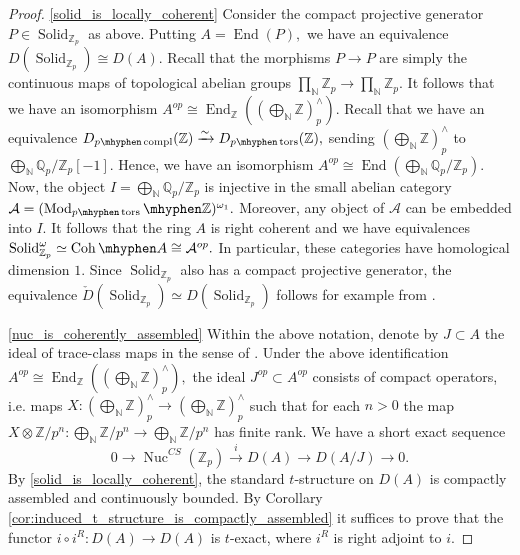 \documentclass[11pt,leqno]{amsart}
\numberwithin{equation}{section}
\def\N{\mathbb{N}}
\def\Z{\mathbb{Z}}
\def\Q{\mathbb{Q}}
\def\End{\operatorname{End}}
\newcommand{\hy}{\mhyphen}
\newcommand{\biggplus}[1][]{\mathop{\bigoplus}\limits_{#1}}
\newcommand{\prodd}[1][]{\mathop{\prod}\limits_{#1}}
\newcommand{\xto}{\xrightarrow}
\newcommand{\Nuc}{\operatorname{Nuc}}
\newcommand{\Solid}{\operatorname{Solid}}
\newcommand{\Coh}{\operatorname{Coh}}
\newcommand{\cA}{{\mathcal A}}
\newcommand{\tors}{\operatorname{tors}}
\newcommand{\compl}{\operatorname{compl}}
\newcommand{\Mod}{\operatorname{Mod}}
\begin{document}
\begin{proof}
\ref{solid_is_locally_coherent} Consider the compact projective generator $P\in\Solid_{\Z_p}$ as above. Putting $A=\End(P),$ we have an equivalence $D(\Solid_{\Z_p})\cong D(A).$ Recall that the morphisms $P\to P$ are simply the continuous maps of topological abelian groups $\prodd[\N]\Z_p\to \prodd[\N]\Z_p.$ It follows that we have an isomorphism $A^{op}\cong\End_{\Z}((\biggplus[\N]\Z)^{\wedge}_p).$ Recall that we have an equivalence $D_{p\hy\compl}(\Z)\xto{\sim}D_{p\hy\tors}(\Z),$ sending $(\biggplus[\N]\Z)^{\wedge}_p$ to $\biggplus[\N]\Q_p/\Z_p[-1].$ Hence, we have an isomorphism $A^{op}\cong \End(\biggplus[\N]\Q_p/\Z_p).$ Now, the object $I=\biggplus[\N]\Q_p/\Z_p$ is injective in the small abelian category $\cA=(\Mod_{p\hy\tors}\hy\Z)^{\omega_1}.$ Moreover, any object of $\cA$ can be embedded into $I.$ It follows that the ring $A$ is right coherent and we have equivalences $\Solid_{\Z_p}^{\omega}\simeq \Coh\hy A\cong \cA^{op}.$ In particular, these categories have homological dimension $1.$ Since $\Solid_{\Z_p}$ also has a compact projective generator, the equivalence $\check{D}(\Solid_{\Z_p})\simeq D(\Solid_{\Z_p})$ follows for example from \cite[Proposition C.5.8.12]{Lur18}.

\ref{nuc_is_coherently_assembled} Within the above notation, denote by $J\subset A$ the ideal of trace-class maps in the sense of \cite[Definition 13.11]{CS20}. Under the above identification $A^{op}\cong\End_{\Z}((\biggplus[\N]\Z)^{\wedge}_p),$ the ideal $J^{op}\subset A^{op}$ consists of compact operators, i.e. maps $X:(\biggplus[\N]\Z)^{\wedge}_p\to (\biggplus[\N]\Z)^{\wedge}_p$ such that for each $n>0$ the map $X\otimes\Z/p^n:\biggplus[\N]\Z/p^n\to \biggplus[\N]\Z/p^n$ has finite rank. We have a short exact sequence
\begin{equation*}
0\to \Nuc^{CS}(\Z_p)\xto{i} D(A)\to D(A/J)\to 0.
\end{equation*}
By \ref{solid_is_locally_coherent}, the standard $t$-structure on $D(A)$ is compactly assembled and continuously bounded. By Corollary \ref{cor:induced_t_structure_is_compactly_assembled} it suffices to prove that the functor $i\circ i^R:D(A)\to D(A)$ is $t$-exact, where $i^R$ is right adjoint to $i.$ %


\end{proof}
\end{document}
